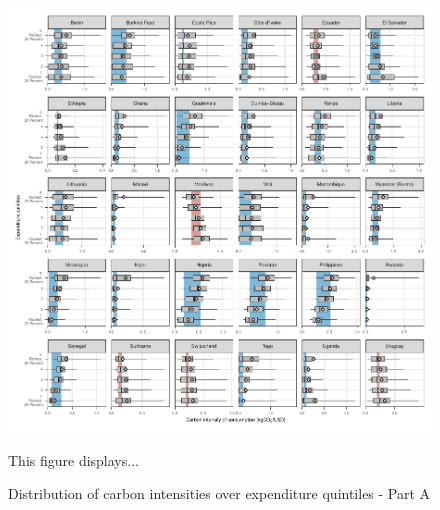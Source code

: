 \documentclass[12pt, a4paper]{article}
\newenvironment{subcaption}
{\strut
\vspace{-5pt}
\begin{minipage}[b]{0.9\textwidth}
  \hspace*{-\parindent}
  \footnotesize}
 {\end{minipage}}
\begin{document}
\begin{figure}[ht!]
  \centering
  \caption{Distribution of carbon intensities over expenditure quintiles - Part A} \label{fig:Quint_A}
  \includegraphics{1_Figures/Figures_Appendix/Figure_1_2017_Appendix_1}
  \begin{subcaption}
    This figure displays...
  \end{subcaption}

\end{figure}

\clearpage
\end{document}
